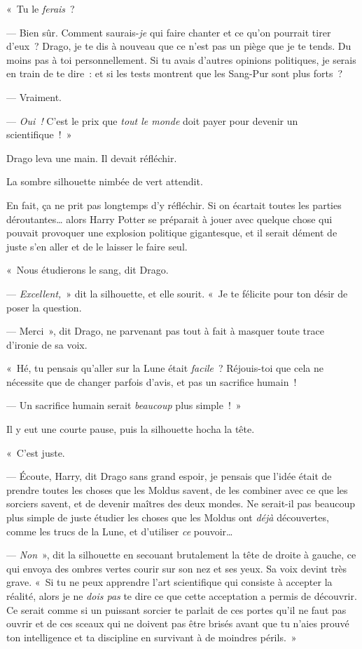 «~Tu le \emph{ferais}~?

--- Bien sûr.
Comment saurais-\emph{je} qui faire chanter et ce qu'on pourrait tirer d'eux~?
Drago, je te dis à nouveau que ce n'est pas un piège que je te tends.
Du moins pas à toi personnellement.
Si tu avais d'autres opinions politiques, je serais en train de te dire~: et si les tests montrent que les Sang-Pur sont plus forts~?

--- Vraiment.

--- \emph{Oui~!} C'est le prix que \emph{tout le monde} doit payer pour devenir un scientifique~!~»

Drago leva une main.
Il devait réfléchir.

La sombre silhouette nimbée de vert attendit.

En fait, ça ne prit pas longtemps d'y réfléchir.
Si on écartait toutes les parties déroutantes… alors Harry Potter se préparait à jouer avec quelque chose qui pouvait provoquer une explosion politique gigantesque, et il serait dément de juste s'en aller et de le laisser le faire seul.

«~Nous étudierons le sang, dit Drago.

--- \emph{Excellent,}~» dit la silhouette, et elle sourit.
«~Je te félicite pour ton désir de poser la question.

--- Merci~», dit Drago, ne parvenant pas tout à fait à masquer toute trace d'ironie de sa voix.

«~Hé, tu pensais qu'aller sur la Lune était \emph{facile}~?
Réjouis-toi que cela ne nécessite que de changer parfois d'avis, et pas un sacrifice humain~!

--- Un sacrifice humain serait \emph{beaucoup} plus simple~!~»

Il y eut une courte pause, puis la silhouette hocha la tête.

«~C'est juste.

--- Écoute, Harry, dit Drago sans grand espoir, je pensais que l'idée était de prendre toutes les choses que les Moldus savent, de les combiner avec ce que les sorciers savent, et de devenir maîtres des deux mondes.
Ne serait-il pas beaucoup plus simple de juste étudier les choses que les Moldus ont \emph{déjà} découvertes, comme les trucs de la Lune, et d'utiliser \emph{ce} pouvoir…

--- \emph{Non}~», dit la silhouette en secouant brutalement la tête de droite à gauche, ce qui envoya des ombres vertes courir sur son nez et ses yeux.
Sa voix devint très grave.
«~Si tu ne peux apprendre l'art scientifique qui consiste à accepter la réalité, alors je ne \emph{dois pas} te dire ce que cette acceptation a permis de découvrir.
Ce serait comme si un puissant sorcier te parlait de ces portes qu'il ne faut pas ouvrir et de ces sceaux qui ne doivent pas être brisés avant que tu n'aies prouvé ton intelligence et ta discipline en survivant à de moindres périls.~»


